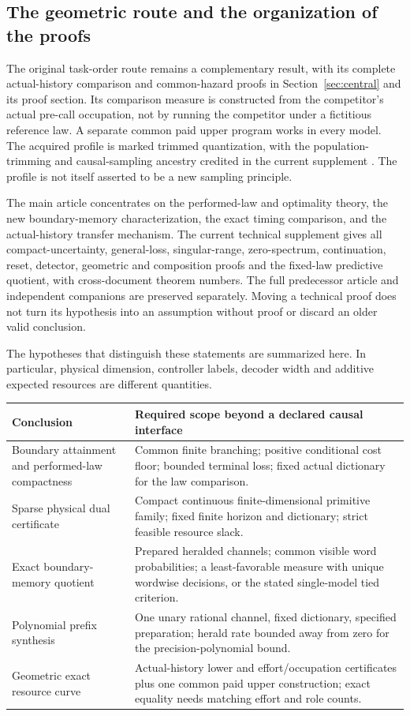 \subsection{The geometric route and the organization of the proofs}
The original task-order route remains a complementary result, with its complete actual-history comparison and common-hazard proofs in Section~\ref{sec:central} and its proof section. Its comparison measure is constructed from the competitor's actual pre-call occupation, not by running the competitor under a fictitious reference law. A separate common paid upper program works in every model. The acquired profile is marked trimmed quantization, with the population-trimming and causal-sampling ancestry credited in the current supplement \cite{CGM97,GG99,LiuVerdu18,GocFlamich24}. The profile is not itself asserted to be a new sampling principle.

The main article concentrates on the performed-law and optimality theory, the new boundary-memory characterization, the exact timing comparison, and the actual-history transfer mechanism. The current technical supplement gives all compact-uncertainty, general-loss, singular-range, zero-spectrum, continuation, reset, detector, geometric and composition proofs and the fixed-law predictive quotient, with cross-document theorem numbers. The full predecessor article and independent companions are preserved separately. Moving a technical proof does not turn its hypothesis into an assumption without proof or discard an older valid conclusion.

The hypotheses that distinguish these statements are summarized here. In particular, physical dimension, controller labels, decoder width and additive expected resources are different quantities.
\begin{center}\small
\begin{tabular}{p{.26\linewidth}p{.65\linewidth}}
\toprule
Conclusion & Required scope beyond a declared causal interface\\
\midrule
Boundary attainment and performed-law compactness & Common finite branching; positive conditional cost floor; bounded terminal loss; fixed actual dictionary for the law comparison.\\[3pt]
Sparse physical dual certificate & Compact continuous finite-dimensional primitive family; fixed finite horizon and dictionary; strict feasible resource slack.\\[3pt]
Exact boundary-memory quotient & Prepared heralded channels; common visible word probabilities; a least-favorable measure with unique wordwise decisions, or the stated single-model tied criterion.\\[3pt]
Polynomial prefix synthesis & One unary rational channel, fixed dictionary, specified preparation; herald rate bounded away from zero for the precision-polynomial bound.\\[3pt]
Geometric exact resource curve & Actual-history lower and effort/occupation certificates plus one common paid upper construction; exact equality needs matching effort and role counts.\\
\bottomrule
\end{tabular}
\end{center}
